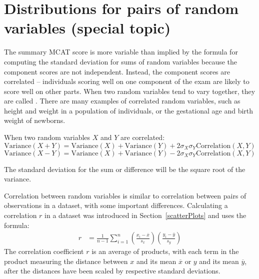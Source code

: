 \section{Distributions for pairs of random variables (special topic)}


The summary MCAT score is more variable than implied by the formula for computing the standard deviation for sums of random variables because the component scores are not independent. Instead, the component scores are correlated -- individuals scoring well on one component of the exam are likely to score well on other parts.  When two random variables tend to vary together, they are called .  There are many examples of correlated random variables, such as height and weight in a population of individuals, or the gestational age and birth weight of newborns.  

When two random variables $X$ and $Y$ are correlated:
\begin{equation*} 
	\text{Variance}(X + Y) = \text{Variance}(X) + \text{Variance}(Y) + 
	2 \sigma_X \sigma_Y\text{Correlation}(X,Y) 
	\label{eq:generalVarianceSumRVs}
\end{equation*}
\begin{equation*}
	\text{Variance}(X - Y) = \text{Variance}(X) + \text{Variance}(Y) - 
	2 \sigma_X \sigma_Y\text{Correlation}(X,Y) 
	\label{eq:generalVarianceDiffRVs}
\end{equation*}

The standard deviation for the sum or difference will be the square root of the variance.


Correlation between random variables is similar to correlation between pairs of observations in a dataset, with some important differences.  Calculating a correlation $r$ in a dataset was introduced in Section~\ref{scatterPlots} and uses the formula:
\begin{align*}
      r &=  \frac{1}{n-1}\sum^{n}_{i=1}
      \left(\frac{x_{i}-\overline{x}}
      {s_{x}}\right)\left(\frac{y_{i}-\overline{y}}{s_{y}}\right)
\end{align*} 
The correlation coefficient $r$ is an average of products, with each term in the product measuring the distance between $x$ and its mean $\overline{x}$ or $y$ and its mean $\overline{y}$, after the distances have been scaled by respective standard deviations.

